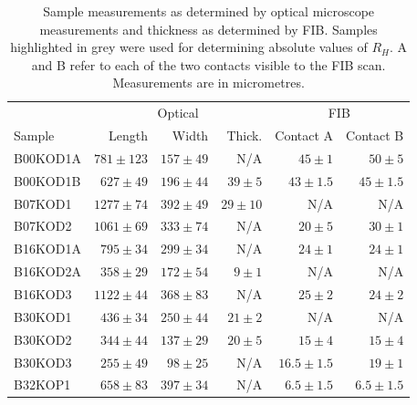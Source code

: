 \begin{table}
    \begin{center}
           \caption{Sample measurements as determined by optical microscope measurements and thickness as determined by \ac{FIB}. Samples highlighted in grey were used for determining absolute values of $R_H$. A and B refer to each of the two contacts visible to the \acs{FIB} scan. Measurements are in micrometres.}
        {\small \begin{tabular}[htbp]{lrrrrr}
\toprule
	& \multicolumn{3}{c}{Optical}			& \multicolumn{2}{c}{\acs{FIB}}		\\
Sample  & Length	& Width		& Thick.	& Contact A    & Contact B    		\\

\midrule
\cellcolor[gray]{0.9}B00KOD1A	& \cellcolor[gray]{0.9}$781\pm123$	& \cellcolor[gray]{0.9}$157\pm49$	& \cellcolor[gray]{0.9}N/A		& \cellcolor[gray]{0.9}$45\pm1$	& \cellcolor[gray]{0.9}$50\pm5$	\\
B00KOD1B	& $627\pm49$	& $196\pm44$	& $39\pm5$ 	& $43\pm1.5$	& $45\pm1.5$	\\
B07KOD1		& $1277\pm74$	& $392\pm49$	& $29\pm10$	& N/A		& N/A		\\
\cellcolor[gray]{0.9}B07KOD2		& \cellcolor[gray]{0.9}$1061\pm69$	& \cellcolor[gray]{0.9}$333\pm74$	& \cellcolor[gray]{0.9}N/A		& \cellcolor[gray]{0.9}$20\pm5$ 	& \cellcolor[gray]{0.9}$30\pm1$ 	\\
\cellcolor[gray]{0.9}B16KOD1A	& \cellcolor[gray]{0.9}$795\pm34$	& \cellcolor[gray]{0.9}$299\pm34$	& \cellcolor[gray]{0.9}N/A		& \cellcolor[gray]{0.9}$24\pm1$ 	& \cellcolor[gray]{0.9}$24\pm1$ 	\\
B16KOD2A	& $358\pm29$	& $172\pm54$	& $9\pm1$ 	& N/A		& N/A		\\
B16KOD3		& $1122\pm44$	& $368\pm83$	& N/A		& $25\pm2$ 	& $24\pm2$ 	\\
B30KOD1	 	& $436\pm34$	& $250\pm44$	& $21\pm2$ 	& N/A		& N/A		\\
B30KOD2		& $344\pm44$	& $137\pm29$	& $20\pm5$ 	& $15\pm4$	& $15\pm4$	\\
\cellcolor[gray]{0.9}B30KOD3 	& \cellcolor[gray]{0.9}$255\pm49$	& \cellcolor[gray]{0.9}$98\pm25$ 	& \cellcolor[gray]{0.9}N/A		& \cellcolor[gray]{0.9}$16.5\pm1.5$	& \cellcolor[gray]{0.9}$19\pm1$	\\
\cellcolor[gray]{0.9}B32KOP1 	& \cellcolor[gray]{0.9}$658\pm83$	& \cellcolor[gray]{0.9}$397\pm34$	& \cellcolor[gray]{0.9}N/A		& \cellcolor[gray]{0.9}$6.5\pm1.5$	& \cellcolor[gray]{0.9}$6.5\pm1.5$	\\

\end{tabular}}
\end{center}
\end{table}
